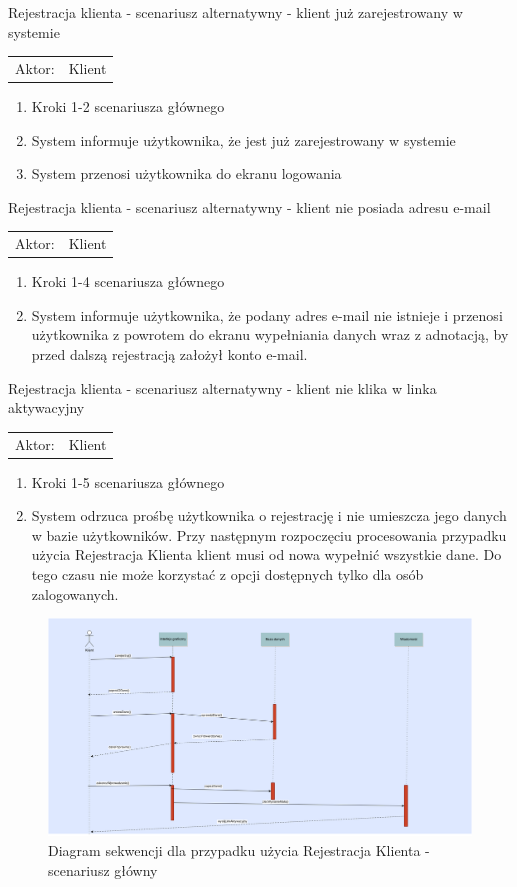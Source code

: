   
  \item Rejestracja klienta - scenariusz alternatywny - klient już
  zarejestrowany w systemie \\
  \begin{tabularx}{\linewidth}{ c X}
  Aktor: & Klient \\
  \end{tabularx}
   \begin{enumerate}
     \item Kroki 1-2 scenariusza głównego
     \item System informuje użytkownika, że jest już zarejestrowany w systemie
     \item System przenosi użytkownika do ekranu logowania
   \end{enumerate} 
   
   \item Rejestracja klienta - scenariusz alternatywny - klient nie posiada
   adresu e-mail
   \begin{tabularx}{\linewidth}{ c X}
	Aktor: & Klient \\
  	\end{tabularx}   
  	\begin{enumerate}
  	  \item Kroki 1-4 scenariusza głównego
  	  \item System informuje użytkownika, że podany adres e-mail nie istnieje i
  	  przenosi użytkownika z powrotem do ekranu wypełniania danych wraz z
  	  adnotacją, by przed dalszą rejestracją założył konto e-mail.
  	\end{enumerate}
  	
  	
\item Rejestracja klienta - scenariusz alternatywny - klient nie klika w linka
aktywacyjny
   \begin{tabularx}{\linewidth}{ c X}
	Aktor: & Klient \\
  	\end{tabularx}   
  	\begin{enumerate}
  	  \item Kroki 1-5 scenariusza głównego
  	  \item System odrzuca prośbę użytkownika o rejestrację i nie umieszcza jego
  	  danych w bazie użytkowników. Przy następnym rozpoczęciu procesowania
  	  przypadku użycia Rejestracja Klienta klient musi od nowa wypełnić wszystkie
  	  dane. Do tego czasu nie może korzystać z opcji dostępnych tylko dla osób
  	  zalogowanych.
  	\end{enumerate}
  	
  	
  	
\begin{figure}[h!]
    \includegraphics[width=\textwidth,
    height=0.5\textheight]{graphics/UseCase/Klient/RejestracjaKlientaSD.png}
  \caption{Diagram sekwencji dla przypadku użycia Rejestracja Klienta -
  scenariusz główny}
\end{figure}